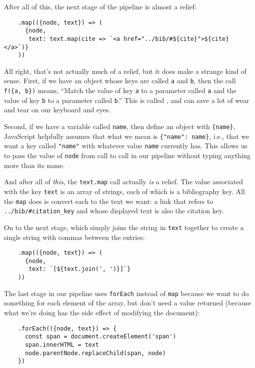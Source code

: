 After all of this,
the next stage of the pipeline is almost a relief:

\begin{verbatim}
    .map(({node, text}) => (
      {node,
       text: text.map(cite => `<a href="../bib/#${cite}">${cite}</a>`)}
    ))
\end{verbatim}

All right,
that's not actually much of a relief,
but it does make a strange kind of sense.
First,
if we have an object whose keys are called \texttt{a} and \texttt{b},
then the call \texttt{f(\{a,\ b\})} means,
``Match the value of key \texttt{a} to a parameter called \texttt{a}
and the value of key \texttt{b} to a parameter called \texttt{b}.''
This is called ,
and can save a lot of wear and tear on our keyboard and eyes.

Second,
if we have a variable called \texttt{name},
then define an object with \texttt{\{name\}},
JavaScript helpfully assumes that what we mean is \texttt{\{"name":\ name\}},
i.e.,
that we want a key called \texttt{"name"}
with whatever value \texttt{name} currently has.
This allows us to pass the value of \texttt{node} from call to call in our pipeline
without typing anything more than its name.

And after all of \emph{this},
the \texttt{text.map} call actually \emph{is} a relief.
The value associated with the key \texttt{text} is an array of strings,
each of which is a bibliography key.
All the \texttt{map} does is convert each to the text we want:
a link that refers to \texttt{../bib/\#citation\_key} and whose displayed text is also the citation key.

On to the next stage,
which simply joins the string in \texttt{text} together to create a single string
with commas between the entries:

\begin{verbatim}
    .map(({node, text}) => (
      {node,
       text: `[${text.join(', ')}]`}
    ))
\end{verbatim}

The last stage in our pipeline uses \texttt{forEach} instead of \texttt{map}
because we want to do something for each element of the array,
but don't need a value returned
(because what we're doing has the side effect of modifying the document):

\begin{verbatim}
    .forEach(({node, text}) => {
      const span = document.createElement('span')
      span.innerHTML = text
      node.parentNode.replaceChild(span, node)
    })
\end{verbatim}

